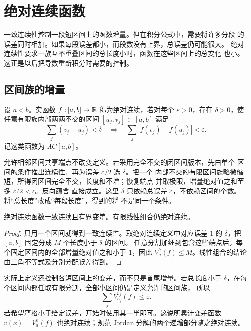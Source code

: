 \chapter{绝对连续函数}
\label{chap:absolute-continuity}

一致连续性控制一段短区间上的函数增量。但在积分公式中，需要将许多分段
的误差同时相加。如果每段误差都小，而段数没有上界，总误差仍可能很大。
绝对连续性要求一族互不重叠区间的总长度小时，函数在这些区间上的总变化
也小。这正是以后把导数重新积分时需要的控制。

\section{区间族的增量}

\begin{definition}
设 \(a<b\)。实函数 \(f:[a,b]\to\mathbb{R}\) 称为绝对连续，若对每个 \(\varepsilon>0\)，存在
\(\delta>0\)，使任意有限族内部两两不交的区间 \([u_j,v_j]\subset[a,b]\) 满足
\[
 \sum_j(v_j-u_j)<\delta
 \quad\Longrightarrow\quad
 \sum_j|f(v_j)-f(u_j)|<\varepsilon.
\]
记这类函数为 \(AC[a,b]\)。
\end{definition}

允许相邻区间共享端点不改变定义。若采用完全不交的闭区间版本，先由单个
区间的条件推出连续性，再为误差 \(\varepsilon/2\) 选 \(\delta\)。把一个
内部不交的有限区间族略微缩短，所得闭区间完全不交，长度和不增；恢复端点
并取极限，增量绝对值之和至多 \(\varepsilon/2<\varepsilon\)。反向蕴含
直接成立。这里 \(\delta\) 只依赖总误差
\(\varepsilon\)，不依赖区间的个数。将“总长度”改成“每段长度”，得到的将
不是同一个条件。

\begin{proposition}\label{prop:ac-bv}
绝对连续函数一致连续且有界变差。有限线性组合仍绝对连续。
\end{proposition}
\begin{proof}
只用一个区间就得到一致连续性。取绝对连续定义中对应误差 \(1\) 的
\(\delta\)，把 \([a,b]\) 固定分成 \(M\) 个长度小于 \(\delta\) 的区间。
任意分割加细到包含这些端点后，每个固定区间内的全部增量绝对值之和小于
\(1\)，因此 \(V_a^b(f)\le M\)。线性组合的结论由三角不等式及分别分配误差得到。
\end{proof}

实际上定义还控制各短区间上的变差，而不只是首尾增量。若总长度小于
\(\delta\)，在每个区间内部任取有限分割，全部小区间仍是定义允许的区间族，
所以
\[
 \sum_j V_{u_j}^{v_j}(f)\le\varepsilon.
\]
若希望严格小于给定误差，开始时使用其一半即可。这说明累计变差函数
\(v(x)=V_a^x(f)\) 也绝对连续；规范 Jordan 分解的两个递增部分随之绝对连续。

